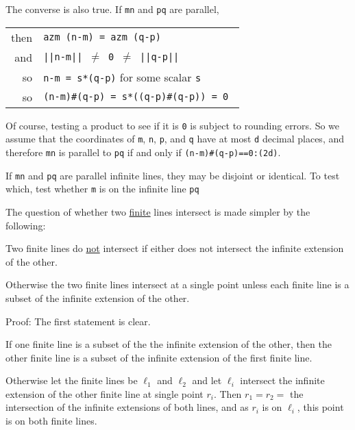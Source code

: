 \documentclass[12pt]{article}
\begin{document}
The converse is also true.  If {\tt mn} and {\tt pq} are parallel, \\
\hspace*{0.3in}\begin{tabular}{r@{~~}l}
then    & {\tt azm (n-m) = azm (q-p)} \\
and     & \tt ||n-m|| $\neq$ 0 $\neq$ ||q-p|| \\
so      & {\tt n-m = s*(q-p)} for some scalar {\tt s} \\
so      & \tt (n-m)\#(q-p) = s*((q-p)\#(q-p)) = 0 \\
        \end{tabular}

Of course, testing a product to see if it is {\tt 0} is subject to
rounding errors.  So we assume that the coordinates of {\tt m},
{\tt n}, {\tt p}, and {\tt q} have at most {\tt d} decimal places,
and therefore {\tt mn} is parallel to {\tt pq} if and only if
{\tt (n-m)\#(q-p)==0:(2d)}.

If {\tt mn} and {\tt pq} are parallel infinite lines, they
may be disjoint or identical.  To test which, test whether
{\tt m} is on the infinite line {\tt pq} 

The question of whether two \underline{finite} lines intersect is made
simpler by the following:
\begin{lemma}
Two finite lines do \underline{not} intersect
if either does not intersect the infinite extension of the other.

Otherwise the two finite lines intersect at a single point unless
each finite line is a subset of the infinite extension of the other.
\end{lemma}
\begin{indpar}{0.3in}
Proof: The first statement is clear.

If one finite line is a subset of the the infinite extension of the
other, then the other finite line is a subset of the infinite extension
of the first finite line.

Otherwise let the finite lines be $\ell_1$ and $\ell_2$ and let
$\ell_i$ intersect the infinite extension of the other finite line
at single point $r_i$.  Then $r_1=r_2=$ the intersection of the infinite
extensions of both lines, and as $r_i$ is on $\ell_i$, this point is
on both finite lines.
\end{indpar}
\end{document}
